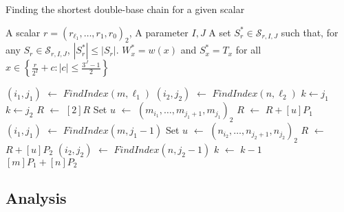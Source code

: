 \begin{algorithm}
	\caption{Finding the shortest double-base chain for a given scalar}
	\begin{algorithmic}
		\Require A scalar $r={(r_{\ell_1},\dots,r_1,r_0)}_2$,
		A parameter $I, J$
		\Ensure A set $S_r^* \in \mathcal{S}_{r,I,J}$ such that, for any $S_r \in \mathcal{S}_{r,I,J}$, $|S^*_r| \leq |S_r|$. 
		\Statex
		\State $W_x^* = w(x)$ and $S_x^* = T_x$ for all $x \in \left\{ \frac{r}{2^I} + c : |c| \leq \frac{3^J - 1}{2} \right\}$
		
		
		\State $(i_1,j_1)$ $\gets$ $FindIndex(m,\ell_1)$		
		\State $(i_2,j_2)$ $\gets$ $FindIndex(n,\ell_2)$		
		 \State $k \gets j_1$
		\Else \State $k \gets j_2$
		\EndIf
		\State $R$ $\gets$ $[2]R$
		\State Set $u$ $\gets$ ${(m_{i_1},\dots,m_{j_1+1},m_{j_1})}_2$
		\State $R$ $\gets$ $R + [u]P_1$		
		\State $(i_1,j_1)$ $\gets$ $FindIndex(m,j_1{-}1)$
		\EndIf
		\State Set $u$ $\gets$ ${(n_{i_2},\dots,n_{j_2+1},n_{j_2})}_2$
		\State $R$ $\gets$ $R + [u]P_2$		
		\State $(i_2,j_2)$ $\gets$ $FindIndex(n,j_2{-}1)$
		\EndIf
		\State $k$ $\gets$ $k - 1$
		\EndWhile
		\\ \Return $[m]P_1 + [n]P_2$
	\end{algorithmic}
	\label{dynamicAlgorithm}
\end{algorithm}

\subsection{Analysis}
\label{analysis}